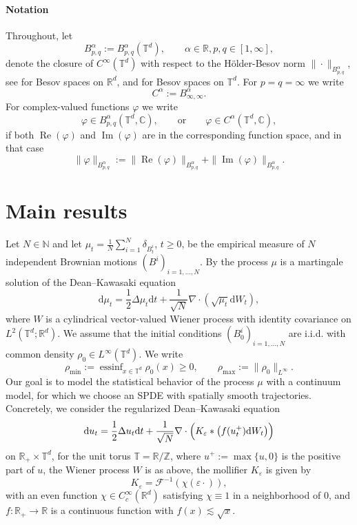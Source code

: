 \documentclass[a4paper,12pt]{article}
\newcommand{\mathd}{\mathrm{d}}
\newcommand{\R}{\mathbb{R}}
\newcommand{\T}{\mathbb{T}}
\newcommand{\C}{\mathbb{C}}
\newcommand{\N}{\mathbb{N}}
\newcommand{\Z}{\mathbb{Z}}
\begin{document}


\paragraph{Notation} 
Throughout, let
\[
    B^\alpha_{p,q} := B^\alpha_{p,q}(\T^d),\qquad \alpha\in \R,p,q\in [1,\infty],
\]
denote the closure of $C^\infty(\T^d)$ with respect to the Hölder-Besov norm $\|\cdot \|_{B^\alpha_{p,q}}$, see \cite{Bahouri2011} for Besov spaces on $\R^d$, and \cite{Schmeisser1987, Gubinelli2015EBP} for Besov spaces on $\T^d$. For $p=q=\infty$ we write
\[
    C^\alpha:=B^\alpha_{\infty,\infty}.
\]
For complex-valued functions $\varphi$ we write
\[
    \varphi \in B^{\alpha}_{p,q}(\T^d, \C),\qquad \text{or} \qquad \varphi \in C^\alpha(\T^d, \C),
\]
if both $\operatorname{Re}(\varphi)$ and $\operatorname{Im}(\varphi)$ are in the corresponding function space, and in that case
\[
    \|\varphi\|_{B^\alpha_{p,q}} := \|\operatorname{Re}(\varphi)\|_{B^\alpha_{p,q}} + \|\operatorname{Im}(\varphi)\|_{B^\alpha_{p,q}}.
\]

\section{Main results}\label{sec:main}


Let $N \in \N$ and let $\mu_t = \frac{1}{N} \sum_{i = 1}^N \delta_{B^i_t}$, $t \geq 0$, be the empirical measure
of $N$ independent Brownian motions $(B^i)_{i = 1,\dots,N}$. By \cite{Dean1996, Konarovskyi2019} the process $\mu$ is a martingale solution of the Dean--Kawasaki equation
\begin{equation*}
    \mathd \mu_t = \frac12 \Delta \mu_t \mathd t + \frac{1}{\sqrt N} \nabla \cdot (\sqrt{\mu_t} \mathd W_t),
\end{equation*}
where $W$ is a cylindrical vector-valued Wiener process with identity covariance on  $L^2 (\mathbb{T}^d; \mathbb{R}^d)$. We assume that the initial conditions $(B^i_0)_{i=1,\dots, N}$ are i.i.d. with common density $\rho_0 \in L^\infty(\mathbb T^d)$. We write 
\begin{equation*}
    \rho_{\min} := \operatorname{essinf}_{x \in \mathbb T^d} \rho_0(x) \geq 0,\qquad \rho_{\max}:=\|\rho_0\|_{L^\infty}.
\end{equation*}
Our goal is to model the statistical behavior of the process $\mu$ with a continuum model, for which we choose an SPDE with spatially smooth trajectories. Concretely, we consider the regularized Dean--Kawasaki equation
\begin{equation}\label{eq:reg_DK}
     \mathd u_t = \frac{1}{2} \Delta u_t \mathd t + \frac{1}{\sqrt{N}} \nabla
   \cdot \Bigl(K_{\varepsilon} \ast \left(f (u_t^+) \mathd W_t\right) \Bigr)
\end{equation}
on $\mathbb{R}_+ \times \mathbb{T}^d$, for the unit torus $\T = \R/\Z$, where $u^+ := \max \{ u,0 \}$ is the positive part of
$u$, the Wiener process $W$ is as above, the mollifier $K_\varepsilon$ is given by
\[ 
K_{\varepsilon} =\mathcal{F}^{- 1} (\chi (\varepsilon\cdot)),
\]
with an even function $\chi \in C^{\infty}_c(\R^d)$ satisfying $\chi \equiv 1$ in a
neighborhood of $0$, and $f:\R_+\to\R$ is a continuous function with $f(x) \lesssim \sqrt{x}$.
\end{document}
